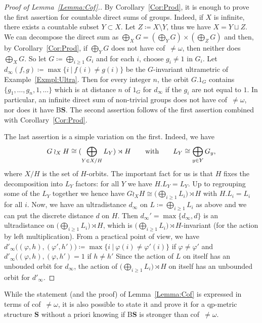 \documentclass[a4paper]{article}
\theoremstyle{definition}
\newcommand*{\BS}{B$\mathbf{S}$}
\newcommand{\setst}[2]{\{#1\ |\ #2\}}
\begin{document}
\begin{proof}[Proof of Lemma~\ref{Lemma:Cof}.]
By Corollary~\ref{Cor:Prod}, it is enough to prove the first assertion for countable direct sums of groups. Indeed, if $X$ is infinite, there exists a countable subset $Y \subset X$. Let $Z \coloneqq X\setminus Y$, thus we have $X = Y \sqcup Z$. We can decompose the direct sum as $\bigoplus_XG = (\bigoplus_YG) \times (\bigoplus_ZG)$ and then, by Corollary~\ref{Cor:Prod}, if $\bigoplus_YG$ does not have cof~$\neq\omega$, then neither does $\bigoplus_XG$.
So let $G\coloneqq \bigoplus_{i\geq 1}G_i$ and for each $i$, choose $g_i\neq 1$ in $G_i$.
Let $d_\infty(f,g)\coloneqq\max\setst{i}{f(i)\neq g(i)}$ be the $G$-invariant ultrametric of Example~\ref{Exmpl:Ultra}.
Then for every integer $n$, the orbit $G.1_G$ contains $\{g_1,\dots,g_n,1,\dots\}$ which is at distance $n$ of $1_G$ for $d_\infty$ if the $g_i$ are not equal to $1$.
In particular, an infinite direct sum of non-trivial groups does not have cof~$\neq\omega$, nor does it have \BS.
The second assertion follows of the first assertion combined with Corollary~\ref{Cor:Prod}.

The last assertion is a simple variation on the first.
Indeed, we have
\[
	G\wr_XH\cong(\bigoplus_{Y\in X/H}L_Y)\rtimes H\qquad\textnormal{with}\qquad L_Y\cong\bigoplus_{y\in Y}G_y,
\]
where $X/H$ is the set of $H$-orbits.
The important fact for us is that $H$ fixes the decomposition into $L_Y$ factors: for all $Y$ we have $H.L_Y=L_Y$.
Up to regrouping some of the $L_Y$ together we hence have $G\wr_XH\cong\bigl(\bigoplus_{i\geq 1}L_i\bigr)\rtimes H$ with $H.L_i=L_i$ for all $i$.
Now, we have an ultradistance $d_\infty$ on $L\coloneqq\bigoplus_{i\geq 1}L_i$ as above and we can put the discrete distance $d$ on $H$.
Then $d_\infty'=\max\{d_\infty,d\}$ is an ultradistance on $\bigl(\bigoplus_{i\geq 1}L_i\bigr)\rtimes H$, which is $\bigl(\bigoplus_{i\geq 1}L_i\bigr)\rtimes H$-invariant (for the action by left multiplication).
From a practical point of view, we have $d'_\infty\bigl((\varphi,h),(\varphi',h')\bigr)\coloneqq\max\setst{i}{\varphi(i)\neq \varphi'(i)}$ if $\varphi\neq \varphi'$ and $d'_\infty\bigl((\varphi,h),(\varphi,h')=1$ if $h\neq h'$
Since the action of $L$ on itself has an unbouded orbit for $d_\infty$, the action of $\bigl(\bigoplus_{i\geq 1}L_i\bigr)\rtimes H$ on itself has an unbounded orbit for $d'_\infty$.
\end{proof}
%
%
While the statement (and the proof) of Lemma~\ref{Lemma:Cof} is expressed in terms of cof~$\neq\omega$, it is also possible to state it and prove it for a qp-metric structure $\mathbf{S}$ without a priori knowing if \BS{} is stronger than cof~$\neq\omega$.
\end{document}
